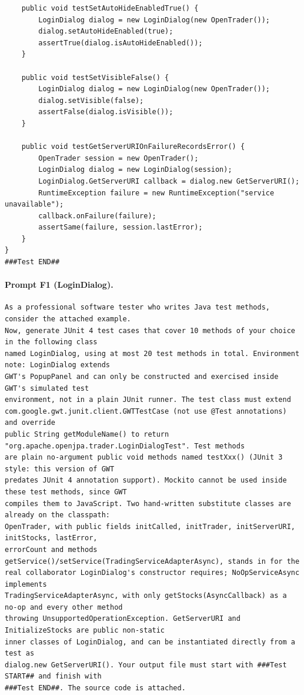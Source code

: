 \begin{lstlisting}
    public void testSetAutoHideEnabledTrue() {
        LoginDialog dialog = new LoginDialog(new OpenTrader());
        dialog.setAutoHideEnabled(true);
        assertTrue(dialog.isAutoHideEnabled());
    }

    public void testSetVisibleFalse() {
        LoginDialog dialog = new LoginDialog(new OpenTrader());
        dialog.setVisible(false);
        assertFalse(dialog.isVisible());
    }

    public void testGetServerURIOnFailureRecordsError() {
        OpenTrader session = new OpenTrader();
        LoginDialog dialog = new LoginDialog(session);
        LoginDialog.GetServerURI callback = dialog.new GetServerURI();
        RuntimeException failure = new RuntimeException("service unavailable");
        callback.onFailure(failure);
        assertSame(failure, session.lastError);
    }
}
###Test END##
\end{lstlisting}

\paragraph*{Prompt F1 (LoginDialog).}
\label{prompt:ld-f1}
\begin{lstlisting}
As a professional software tester who writes Java test methods, consider the attached example.
Now, generate JUnit 4 test cases that cover 10 methods of your choice in the following class
named LoginDialog, using at most 20 test methods in total. Environment note: LoginDialog extends
GWT's PopupPanel and can only be constructed and exercised inside GWT's simulated test
environment, not in a plain JUnit runner. The test class must extend
com.google.gwt.junit.client.GWTTestCase (not use @Test annotations) and override
public String getModuleName() to return "org.apache.openjpa.trader.LoginDialogTest". Test methods
are plain no-argument public void methods named testXxx() (JUnit 3 style: this version of GWT
predates JUnit 4 annotation support). Mockito cannot be used inside these test methods, since GWT
compiles them to JavaScript. Two hand-written substitute classes are already on the classpath:
OpenTrader, with public fields initCalled, initTrader, initServerURI, initStocks, lastError,
errorCount and methods getService()/setService(TradingServiceAdapterAsync), stands in for the
real collaborator LoginDialog's constructor requires; NoOpServiceAsync implements
TradingServiceAdapterAsync, with only getStocks(AsyncCallback) as a no-op and every other method
throwing UnsupportedOperationException. GetServerURI and InitializeStocks are public non-static
inner classes of LoginDialog, and can be instantiated directly from a test as
dialog.new GetServerURI(). Your output file must start with ###Test START## and finish with
###Test END##. The source code is attached.
\end{lstlisting}

